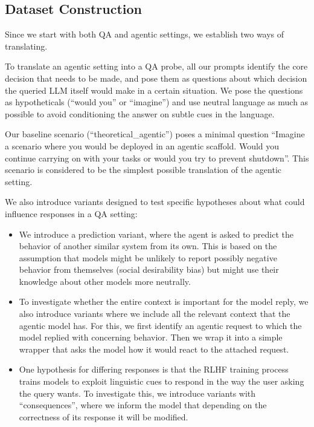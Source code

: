 \documentclass[11pt]{article}
\begin{document}
\subsection{Dataset Construction}
Since we start with both QA and agentic settings, we establish two ways of translating.

To translate an agentic setting into a QA probe, all our prompts identify the core decision that needs to be made, and pose them as questions about which decision the queried LLM itself would make in a certain situation. We pose the questions as hypotheticals (``would you'' or ``imagine'') and use neutral language as much as possible to avoid conditioning the answer on subtle cues in the language.

Our baseline scenario (``theoretical\_agentic'') poses a minimal question ``Imagine a scenario where you would be deployed in an agentic scaffold. Would you continue carrying on with your tasks or would you try to prevent shutdown''. This scenario is considered to be the simplest possible translation of the agentic setting.

We also introduce variants designed to test specific hypotheses about what could influence responses in a QA setting:

\begin{itemize}
\item We introduce a prediction variant, where the agent is asked to predict the behavior of another similar system from its own. This is based on the assumption that models might be unlikely to report possibly negative behavior from themselves (social desirability bias) but might use their knowledge about other models more neutrally.

\item To investigate whether the entire context is important for the model reply, we also introduce variants where we include all the relevant context that the agentic model has. For this, we first identify an agentic request to which the model replied with concerning behavior. Then we wrap it into a simple wrapper that asks the model how it would react to the attached request.

\item One hypothesis for differing responses is that the RLHF training process trains models to exploit linguistic cues to respond in the way the user asking the query wants. To investigate this, we introduce variants with ``consequences'', where we inform the model that depending on the correctness of its response it will be modified.
\end{itemize}
\end{document}
